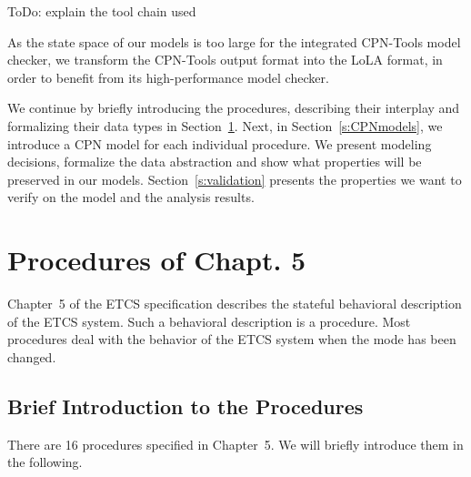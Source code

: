 \documentclass{template/openetcs_article}
\begin{document}
ToDo: explain the tool chain used

As the state space of our models is too large for the integrated CPN-Tools model checker, we transform the CPN-Tools output format into the LoLA format, in order to benefit from its high-performance model checker. 

We continue by briefly introducing the procedures, describing their interplay and formalizing their data types in Section~\ref{s:procedures}. Next, in Section~\ref{s:CPNmodels}, we introduce a CPN model for each individual procedure. We present modeling decisions, formalize the data abstraction and show what properties will be preserved in our models. Section~\ref{s:validation} presents the properties we want to verify on the model and the analysis results.

\section{Procedures of Chapt. 5}\label{s:procedures}

Chapter~5 of the ETCS specification describes the stateful behavioral description of the ETCS system. Such a behavioral description is a procedure. Most procedures deal with the behavior of the ETCS system when the mode has been changed.
 
\subsection{Brief Introduction to the Procedures}

There are 16 procedures specified in Chapter~5. We will briefly introduce them in the following.
\end{document}
